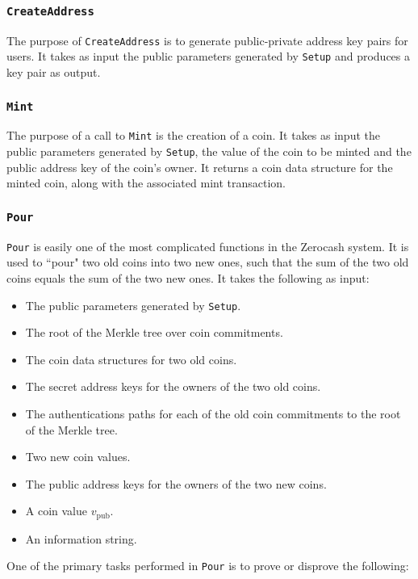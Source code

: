 \documentclass{article}
\begin{document}
\subsubsection{\texttt{CreateAddress}}
The purpose of \texttt{CreateAddress} is to generate public-private address key pairs for users. It takes as input the public parameters generated by \texttt{Setup} and produces a key pair as output.

\subsubsection{\texttt{Mint}}
The purpose of a call to \texttt{Mint} is the creation of a coin. It takes as input the public parameters generated by \texttt{Setup}, the value of the coin to be minted and the public address key of the coin's owner. It returns a coin data structure for the minted coin, along with the associated mint transaction.

\subsubsection{\texttt{Pour}}
\texttt{Pour} is easily one of the most complicated functions in the Zerocash system. It is used to ``pour" two old coins into two new ones, such that the sum of the two old coins equals the sum of the two new ones. It takes the following as input:

\begin{itemize}
\item The public parameters generated by \texttt{Setup}.
\item The root of the Merkle tree over coin commitments.
\item The coin data structures for two old coins.
\item The secret address keys for the owners of the two old coins.
\item The authentications paths for each of the old coin commitments to the root of the Merkle tree.
\item Two new coin values.
\item The public address keys for the owners of the two new coins.
\item A coin value $v_\text{pub}$.
\item An information string.
\end{itemize}

One of the primary tasks performed in \texttt{Pour} is to prove or disprove the following: \newline
\end{document}
